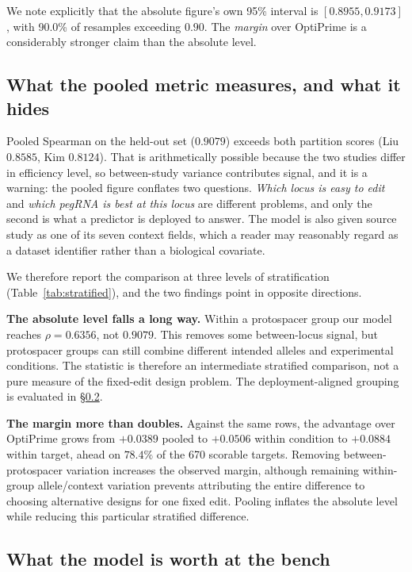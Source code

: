 \documentclass[11pt]{article}
\newcommand{\rhoS}{\rho}
\begin{document}
We note explicitly that the absolute figure's own 95\% interval is $[0.8955,0.9173]$,
with 90.0\% of resamples exceeding $0.90$. The \emph{margin} over OptiPrime is a
considerably stronger claim than the absolute level.

\subsection{What the pooled metric measures, and what it hides}
\label{sec:stratified}

Pooled Spearman on the held-out set ($0.9079$) exceeds both partition scores (Liu
$0.8585$, Kim $0.8124$). That is arithmetically possible because the two studies differ
in efficiency level, so between-study variance contributes signal, and it is a warning:
the pooled figure conflates two questions. \emph{Which locus is easy to edit} and
\emph{which pegRNA is best at this locus} are different problems, and only the second is
what a predictor is deployed to answer. The model is also given source study as one of
its seven context fields, which a reader may reasonably regard as a dataset identifier
rather than a biological covariate.

We therefore report the comparison at three levels of stratification
(Table~\ref{tab:stratified}), and the two findings point in opposite directions.

\textbf{The absolute level falls a long way.} Within a protospacer group our model
reaches $\rhoS = 0.6356$, not $0.9079$. This removes some between-locus signal, but
protospacer groups can still combine different intended alleles and experimental
conditions. The statistic is therefore an intermediate stratified comparison, not
a pure measure of the fixed-edit design problem. The deployment-aligned grouping
is evaluated in \S\ref{sec:utility}.

\textbf{The margin more than doubles.} Against the same rows, the advantage over
OptiPrime grows from $+0.0389$ pooled to $+0.0506$ within condition to $+0.0884$ within
target, ahead on $78.4\%$ of the 670 scorable targets. Removing between-protospacer
variation increases the observed margin, although remaining within-group
allele/context variation prevents attributing the entire difference to choosing
alternative designs for one fixed edit. Pooling inflates the absolute level while
reducing this particular stratified difference.



\subsection{What the model is worth at the bench}
\label{sec:utility}
\end{document}
